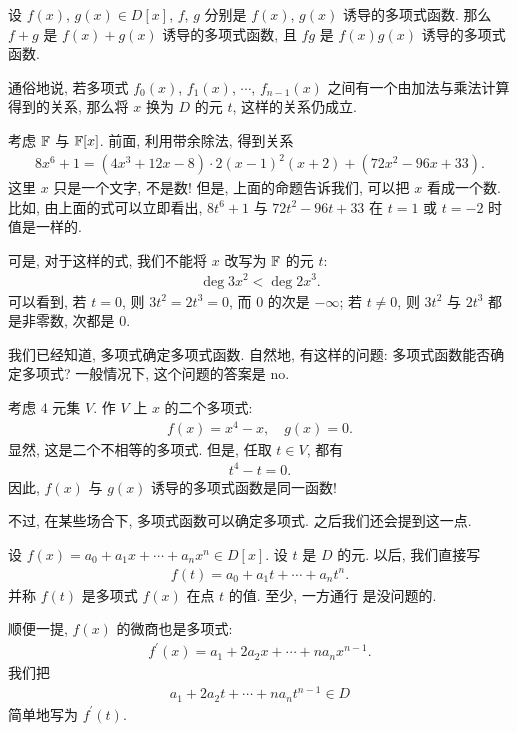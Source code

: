 \begin{proposition}
    设 $f(x)$, $g(x) \in D[x]$, $f$, $g$ 分别是 $f(x)$, $g(x)$ 诱导的多项式函数. 那么 $f+g$ 是 $f(x)+g(x)$ 诱导的多项式函数, 且 $fg$ 是 $f(x)g(x)$ 诱导的多项式函数.

    通俗地说, 若多项式 $f_0 (x)$, $f_1 (x)$, $\cdots$, $f_{n-1} (x)$ 之间有一个由加法与乘法计算得到的关系, 那么将 $x$ 换为 $D$ 的元 $t$, 这样的关系仍成立.
\end{proposition}

\begin{example}
    考虑 $\mathbb{F}$ 与 $\mathbb{F}[x]$. 前面, 利用带余除法, 得到关系
    \begin{align*}
        8x^6 + 1 = (4x^3 + 12x - 8) \cdot 2(x-1)^2 (x+2) + (72x^2 - 96x + 33).
    \end{align*}
    这里 $x$ 只是一个文字, 不是数! 但是, 上面的命题告诉我们, 可以把 $x$ 看成一个数. 比如, 由上面的式可以立即看出, $8t^6 + 1$ 与 $72t^2 - 96t + 33$ 在 $t = 1$ 或 $t = -2$ 时值是一样的.

    可是, 对于这样的式, 我们不能将 $x$ 改写为 $\mathbb{F}$ 的元 $t$:
    \begin{align*}
        \deg 3x^2 < \deg 2x^3.
    \end{align*}
    可以看到, 若 $t=0$, 则 $3t^2 = 2t^3 = 0$, 而 $0$ 的次是 $-\infty$; 若 $t \neq 0$, 则 $3t^2$ 与 $2t^3$ 都是非零数, 次都是 $0$.
\end{example}

\begin{remark}
    我们已经知道, 多项式确定多项式函数. 自然地, 有这样的问题: 多项式函数能否确定多项式? 一般情况下, 这个问题的答案是 no.

    考虑 $4$ 元集 $V$. 作 $V$ 上 $x$ 的二个多项式:
    \begin{align*}
        f(x) = x^4 - x, \quad g(x) = 0.
    \end{align*}
    显然, 这是二个不相等的多项式. 但是, 任取 $t \in V$, 都有
    \begin{align*}
        t^4 - t = 0.
    \end{align*}
    因此, $f(x)$ 与 $g(x)$ 诱导的多项式函数是同一函数!

    不过, 在某些场合下, 多项式函数可以确定多项式. 之后我们还会提到这一点.
\end{remark}

\begin{remark}
    设 $f(x) = a_0 + a_1 x + \cdots + a_n x^n \in D[x]$. 设 $t$ 是 $D$ 的元. 以后, 我们直接写
    \begin{align*}
        f(t) = a_0 + a_1 t + \cdots + a_n t^n.
    \end{align*}
    并称 $f(t)$ 是多项式 $f(x)$ 在点  $t$ 的值. 至少, 一方通行  是没问题的.

    顺便一提, $f(x)$ 的微商也是多项式:
    \begin{align*}
        f^{\prime} (x) = a_1 + 2a_2 x + \cdots + na_n x^{n-1}.
    \end{align*}
    我们把
    \begin{align*}
        a_1 + 2a_2 t + \cdots + na_n t^{n-1} \in D
    \end{align*}
    简单地写为 $f^{\prime} (t)$.
\end{remark}

